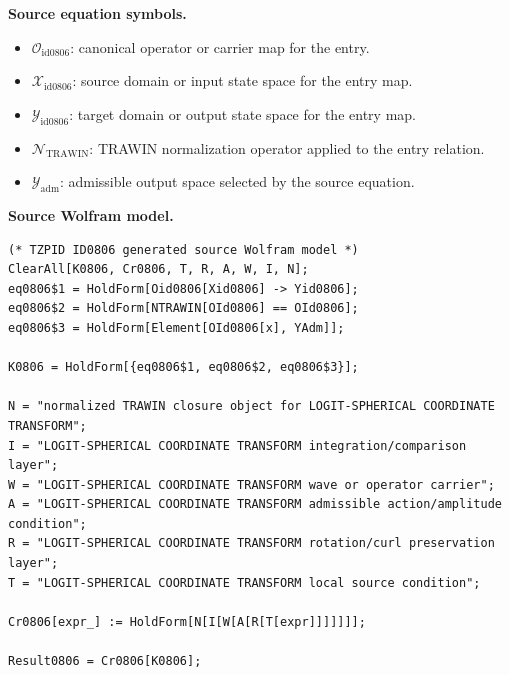 \begin{minipage}[t]{0.49\linewidth}
\begingroup
\small
\raggedright
\textbf{Source equation symbols.}\par
\begin{itemize}[leftmargin=1.35em,itemsep=1pt,topsep=1pt,parsep=0pt]
    \item $\mathcal{O}_{\mathrm{id0806}}$: canonical operator or carrier map for the entry.
    \item $\mathcal{X}_{\mathrm{id0806}}$: source domain or input state space for the entry map.
    \item $\mathcal{Y}_{\mathrm{id0806}}$: target domain or output state space for the entry map.
    \item $\mathcal{N}_{\mathrm{TRAWIN}}$: TRAWIN normalization operator applied to the entry relation.
    \item $\mathcal{Y}_{\mathrm{adm}}$: admissible output space selected by the source equation.
\end{itemize}
\endgroup
\end{minipage}\hfill
\begin{minipage}[t]{0.47\linewidth}
\begingroup
\scriptsize
\raggedright
\textbf{Source Wolfram model.}\par
\begin{Verbatim}[fontsize=\tiny,breaklines=true,breakanywhere=true]
(* TZPID ID0806 generated source Wolfram model *)
ClearAll[K0806, Cr0806, T, R, A, W, I, N];
eq0806$1 = HoldForm[Oid0806[Xid0806] -> Yid0806];
eq0806$2 = HoldForm[NTRAWIN[OId0806] == OId0806];
eq0806$3 = HoldForm[Element[OId0806[x], YAdm]];

K0806 = HoldForm[{eq0806$1, eq0806$2, eq0806$3}];

N = "normalized TRAWIN closure object for LOGIT-SPHERICAL COORDINATE TRANSFORM";
I = "LOGIT-SPHERICAL COORDINATE TRANSFORM integration/comparison layer";
W = "LOGIT-SPHERICAL COORDINATE TRANSFORM wave or operator carrier";
A = "LOGIT-SPHERICAL COORDINATE TRANSFORM admissible action/amplitude condition";
R = "LOGIT-SPHERICAL COORDINATE TRANSFORM rotation/curl preservation layer";
T = "LOGIT-SPHERICAL COORDINATE TRANSFORM local source condition";

Cr0806[expr_] := HoldForm[N[I[W[A[R[T[expr]]]]]]];

Result0806 = Cr0806[K0806];
\end{Verbatim}
\endgroup
\end{minipage}

